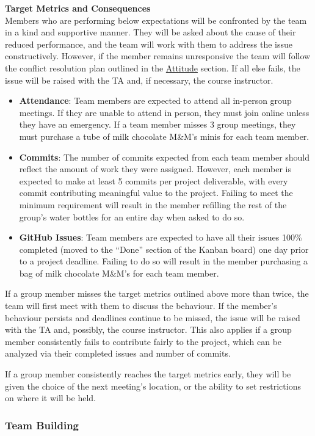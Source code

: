 \documentclass{article}
\begin{document}
\noindent \textbf{Target Metrics and Consequences} \\
Members who are performing below expectations will be confronted by the team in a kind and supportive manner. 
They will be asked about the cause of their reduced performance, and the team will work with them to address the issue constructively. 
However, if the member remains unresponsive the team will follow the conflict resolution plan outlined in the \hyperref[sec:Attitude]{Attitude} section. If all else fails, the issue will be raised with the TA and, if necessary, the course instructor. 
\begin{itemize}
    \item \textbf{Attendance}: Team members are expected to attend all in-person group meetings. If they are unable to attend in person, they must join online unless they have an emergency. If a team member misses 3 group meetings, they must purchase a tube of milk chocolate M\&M’s minis for each team member.
    \item \textbf{Commits}: The number of commits expected from each team member should reflect the amount of work they were assigned. However, each member is expected to make at least 5 commits per project deliverable, with every commit contributing meaningful value to the project. Failing to meet the minimum requirement will result in the member refilling the rest of the group’s water bottles for an entire day when asked to do so.
    \item \textbf{GitHub Issues}: Team members are expected to have all their issues 100\% completed (moved to the “Done” section of the Kanban board) one day prior to a project deadline. Failing to do so will result in the member purchasing a bag of milk chocolate M\&M’s for each team member.
\end{itemize}
If a group member misses the target metrics outlined above more than twice, the team will first meet with them to discuss the behaviour. 
If the member’s behaviour persists and deadlines continue to be missed, the issue will be raised with the TA and, possibly, the course instructor. 
This also applies if a group member consistently fails to contribute fairly to the project, which can be analyzed via their completed issues and number of commits.

If a group member consistently reaches the target metrics early, they will be given the choice of the next meeting's location, or the ability to set restrictions on where it will be held.


\subsubsection*{Team Building}
\end{document}
